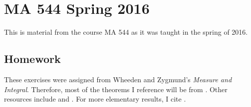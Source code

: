 
\chapter{MA 544 Spring 2016}
\thispagestyle{empty}
This is material from the course MA 544 as it was taught in the spring of
2016.
\bigskip
\section{Homework}
These exercises were assigned from Wheeden and Zygmund's \emph{Measure and
  Integral}. Therefore, most of the theorems I reference will be from
\cite{wheeden-zygmund}. Other resources include \cite{folland} and
\cite{royden}. For more elementary results, I cite \cite{rudin-1}.
